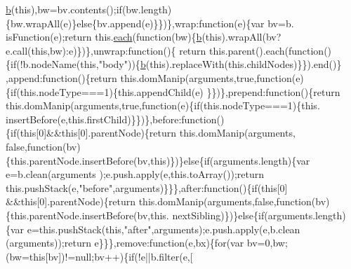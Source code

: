\begin{DoxyCode}
{      \hyperlink{jquery_8js_aa4026ad5544b958e54ce5e106fa1c805}{b}(\textcolor{keyword}{this}),bw=bv.contents();\textcolor{keywordflow}{if}(bw.length)\{bw.wrapAll(e)\}\textcolor{keywordflow}{else}\{bv.append(e)\}\})\},wrap:\textcolor{keyword}{function}(e)\{var bv=b.
      isFunction(e);\textcolor{keywordflow}{return} this.\hyperlink{jquery_8js_a871ff39db627c54c710a3e9909b8234c}{each}(\textcolor{keyword}{function}(bw)\{\hyperlink{jquery_8js_aa4026ad5544b958e54ce5e106fa1c805}{b}(\textcolor{keyword}{this}).wrapAll(bv?e.call(\textcolor{keyword}{this},bw):e)\})\},unwrap:\textcolor{keyword}{function}()\{\textcolor{keywordflow}{
      return} this.parent().each(\textcolor{keyword}{function}()\{\textcolor{keywordflow}{if}(!b.nodeName(\textcolor{keyword}{this},\textcolor{stringliteral}{"body"}))\{\hyperlink{jquery_8js_aa4026ad5544b958e54ce5e106fa1c805}{b}(\textcolor{keyword}{this}).replaceWith(this.childNodes)\}\}).end()\}
      ,append:\textcolor{keyword}{function}()\{\textcolor{keywordflow}{return} this.domManip(arguments,\textcolor{keyword}{true},\textcolor{keyword}{function}(e)\{\textcolor{keywordflow}{if}(this.nodeType===1)\{this.appendChild(e)
      \}\})\},prepend:\textcolor{keyword}{function}()\{\textcolor{keywordflow}{return} this.domManip(arguments,\textcolor{keyword}{true},\textcolor{keyword}{function}(e)\{\textcolor{keywordflow}{if}(this.nodeType===1)\{this.
      insertBefore(e,this.firstChild)\}\})\},before:\textcolor{keyword}{function}()\{\textcolor{keywordflow}{if}(\textcolor{keyword}{this}[0]&&\textcolor{keyword}{this}[0].parentNode)\{\textcolor{keywordflow}{return} this.domManip(arguments,\textcolor{keyword}{
      false},\textcolor{keyword}{function}(bv)\{this.parentNode.insertBefore(bv,\textcolor{keyword}{this})\})\}\textcolor{keywordflow}{else}\{\textcolor{keywordflow}{if}(arguments.length)\{var e=b.clean(arguments
      );e.push.apply(e,this.toArray());\textcolor{keywordflow}{return} this.pushStack(e,\textcolor{stringliteral}{"before"},arguments)\}\}\},after:\textcolor{keyword}{function}()\{\textcolor{keywordflow}{if}(\textcolor{keyword}{this}[0]
      &&\textcolor{keyword}{this}[0].parentNode)\{\textcolor{keywordflow}{return} this.domManip(arguments,\textcolor{keyword}{false},\textcolor{keyword}{function}(bv)\{this.parentNode.insertBefore(bv,this.
      nextSibling)\})\}\textcolor{keywordflow}{else}\{\textcolor{keywordflow}{if}(arguments.length)\{var e=this.pushStack(\textcolor{keyword}{this},\textcolor{stringliteral}{"after"},arguments);e.push.apply(e,b.clean
      (arguments));\textcolor{keywordflow}{return} e\}\}\},\textcolor{keyword}{remove}:\textcolor{keyword}{function}(e,bx)\{\textcolor{keywordflow}{for}(var bv=0,bw;(bw=\textcolor{keyword}{this}[bv])!=null;bv++)\{\textcolor{keywordflow}{if}(!e||b.filter(e,[
}
\end{DoxyCode}
